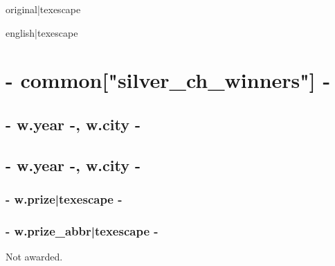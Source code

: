 {%

{%
{%
{{ original|texescape }} {%
{%
{ } \textbar{} {{ english|texescape }}
{%
 {%
{%
{%

{%
{%
{%
{%
{%
{%
{%
{%
{%
{%

{%
\chapter*{ {{- common["silver_ch_winners"] -}} }
{%
{%
    \section*{ {{- w.year -}}, {{ w.city -}} }
{%
    \section*{ {{- w.year -}}, {{ w.city -}} }
{%
{%
        {%
           \subsection*{ {{- w.prize|texescape -}} }
        {%
            \subsection*{ {{- w.prize_abbr|texescape -}} }
        {%
{%
{%
Not awarded.
{%
}}}}}}}}}}}}}}}}}}}}}}}}}}}}}}}
